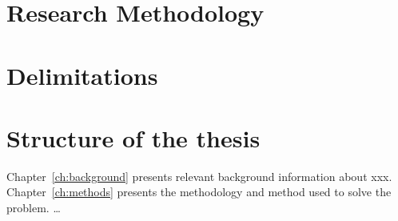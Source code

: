 \documentclass[english, biblatex, digitaloutput]{kththesis}
\begin{document}

\section{Research Methodology}

\section{Delimitations}

\section{Structure of the thesis}
\label{sec:structure}
Chapter~\ref{ch:background} presents relevant background information about xxx.  Chapter~\ref{ch:methods} presents the methodology and method used to solve the problem. …
\end{document}
